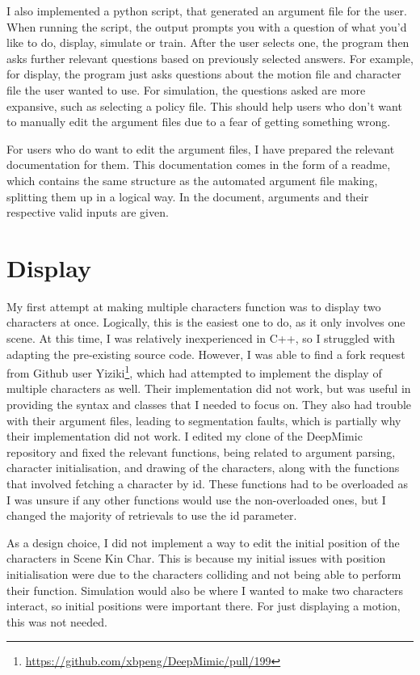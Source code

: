\documentclass{l4proj}
\begin{document}
I also implemented a python script, that generated an argument file for the user. When running the script, the output prompts you with a question of what you'd like to do, display, simulate or train. After the user selects one, the program then asks further relevant questions based on previously selected answers. For example, for display, the program just asks questions about the motion file and character file the user wanted to use. For simulation, the questions asked are more expansive, such as selecting a policy file. This should help users who don't want to manually edit the argument files due to a fear of getting something wrong.

For users who do want to edit the argument files, I have prepared the relevant documentation for them. This documentation comes in the form of a readme, which contains the same structure as the automated argument file making, splitting them up in a logical way. In the document, arguments and their respective valid inputs are given.

\section{Display}
My first attempt at making multiple characters function was to display two characters at once. Logically, this is the easiest one to do, as it only involves one scene. At this time, I was relatively inexperienced in C++, so I struggled with adapting the pre-existing source code. However, I was able to find a fork request from Github user Yiziki\footnote{\url{https://github.com/xbpeng/DeepMimic/pull/199}}, which had attempted to implement the display of multiple characters as well. Their implementation did not work, but was useful in providing the syntax and classes that I needed to focus on. They also had trouble with their argument files, leading to segmentation faults, which is partially why their implementation did not work. I edited my clone of the DeepMimic repository and fixed the relevant functions, being related to argument parsing, character initialisation, and drawing of the characters, along with the functions that involved fetching a character by id. These functions had to be overloaded as I was unsure if any other functions would use the non-overloaded ones, but I changed the majority of retrievals to use the id parameter.

As a design choice, I did not implement a way to edit the initial position of the characters in Scene Kin Char. This is because my initial issues with position initialisation were due to the characters colliding and not being able to perform their function. Simulation would also be where I wanted to make two characters interact, so initial positions were important there. For just displaying a motion, this was not needed.
\end{document}
